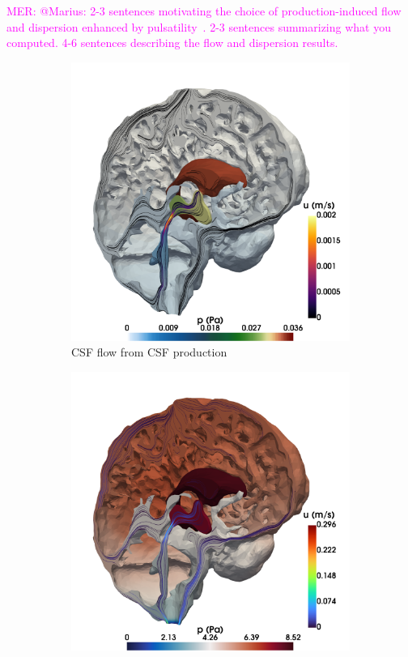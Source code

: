 \documentclass[fleqn,10pt]{wlscirep}
\newcommand{\mer}[1]{\textcolor{magenta}{#1}}
\newcommand{\draft}[1]{\textcolor{gray}{#1}}
\begin{document}
\mer{MER: @Marius: 2-3 sentences motivating the choice of production-induced flow and dispersion enhanced by pulsatility~\cite{ray2021quantitative}. 2-3 sentences summarizing what you computed. 4-6 sentences describing the flow and dispersion results.} \draft{\lipsum[1]} 
\begin{figure}[h!]
\centering 
\begin{subfigure}[b]{0.33\textwidth}
\includegraphics[width = 1 \textwidth]{figures/csf_v.png}
\caption{CSF flow from CSF production}
\label{fig:csf_flow_prod}
\end{subfigure}
\begin{subfigure}[b]{0.33\textwidth}
\includegraphics[width = 1 \textwidth]{figures/cardiac_csf_v.png}

\end{subfigure}
\end{figure}
\end{document}
